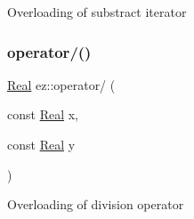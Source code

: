 Overloading of substract iterator \mbox{\label{namespaceez_a69597aa103ea12a5ed7a71411f94bff7}} 
\subsubsection{\texorpdfstring{operator/()}{operator/()}}
{\footnotesize\ttfamily \hyperlink{classez_1_1objects_1_1Real}{Real} ez\+::operator/ (\begin{DoxyParamCaption}\item[{const \hyperlink{classez_1_1objects_1_1Real}{Real}}]{x,  }\item[{const \hyperlink{classez_1_1objects_1_1Real}{Real}}]{y }\end{DoxyParamCaption})}

Overloading of division operator 